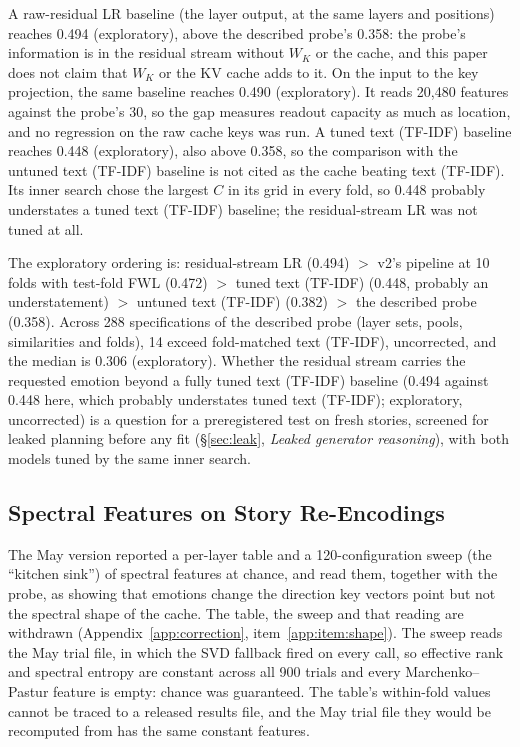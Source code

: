 A raw-residual LR baseline (the layer output, at the same layers and positions) reaches 0.494 (exploratory), above the described probe's 0.358: the probe's information is in the residual stream without $W_K$ or the cache, and this paper does not claim that $W_K$ or the KV cache adds to it. On the input to the key projection, the same baseline reaches 0.490 (exploratory). It reads 20{,}480 features against the probe's 30, so the gap measures readout capacity as much as location, and no regression on the raw cache keys was run. A tuned text (TF-IDF) baseline reaches 0.448 (exploratory), also above 0.358, so the comparison with the untuned text (TF-IDF) baseline is not cited as the cache beating text (TF-IDF). Its inner search chose the largest $C$ in its grid in every fold, so 0.448 probably understates a tuned text (TF-IDF) baseline; the residual-stream LR was not tuned at all.

The exploratory ordering is: residual-stream LR (0.494) $>$ v2's pipeline at 10 folds with test-fold FWL (0.472) $>$ tuned text (TF-IDF) (0.448, probably an understatement) $>$ untuned text (TF-IDF) (0.382) $>$ the described probe (0.358). Across 288 specifications of the described probe (layer sets, pools, similarities and folds), 14 exceed fold-matched text (TF-IDF), uncorrected, and the median is 0.306 (exploratory). Whether the residual stream carries the requested emotion beyond a fully tuned text (TF-IDF) baseline (0.494 against 0.448 here, which probably understates tuned text (TF-IDF); exploratory, uncorrected) is a question for a preregistered test on fresh stories, screened for leaked planning before any fit (\S\ref{sec:leak}, \emph{Leaked generator reasoning}), with both models tuned by the same inner search.

\subsection{Spectral Features on Story Re-Encodings}
\label{sec:spectral_null}

The May version reported a per-layer table and a 120-configuration sweep (the ``kitchen sink'') of spectral features at chance, and read them, together with the probe, as showing that emotions change the direction key vectors point but not the spectral shape of the cache. The table, the sweep and that reading are withdrawn (Appendix~\ref{app:correction}, item~\ref{app:item:shape}). The sweep reads the May trial file, in which the SVD fallback fired on every call, so effective rank and spectral entropy are constant across all 900 trials and every Marchenko--Pastur feature is empty: chance was guaranteed. The table's within-fold values cannot be traced to a released results file, and the May trial file they would be recomputed from has the same constant features.

